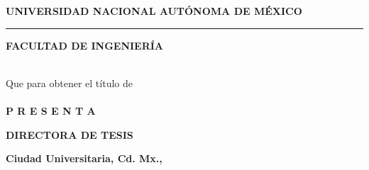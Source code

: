 \begin{minipage}[c][9.5cm][s]{12.5cm}
  \begin{center}
    \vspace{4mm}
    {\large \textbf{UNIVERSIDAD NACIONAL AUTÓNOMA DE MÉXICO}}
    \vspace{.25cm}
    \hrule height1.2pt
    \vspace{.15cm}

    {\large \textbf{FACULTAD DE INGENIERÍA}}

    \vspace{2.8cm}

    \begin{spacing}{2.0}
    {\LARGE \textbf{\eltitulo}}
    \end{spacing}

    \vspace{2.9cm}

    \\[8pt]
    {\large Que para obtener el título de}\\[8pt]
    {\Large \textbf{\lacarrera}}\\
    \vspace{2.2cm}
    {\Large \textbf{P R E S E N T A}}\\[8pt]
    {\Large\elnombre}

    \vspace{2.2cm}

    {\Large \textbf{DIRECTORA DE TESIS}}\\[8pt] {\Large \elasesor}

    \vspace{2.5cm}
\begin{flushright}
    \textbf{Ciudad Universitaria, Cd. Mx., \lafecha}
\end{flushright}

  \end{center}
\end{minipage}

\clearpage
\thispagestyle{empty}
\hphantom{1cm}
\pagebreak
\newpage


